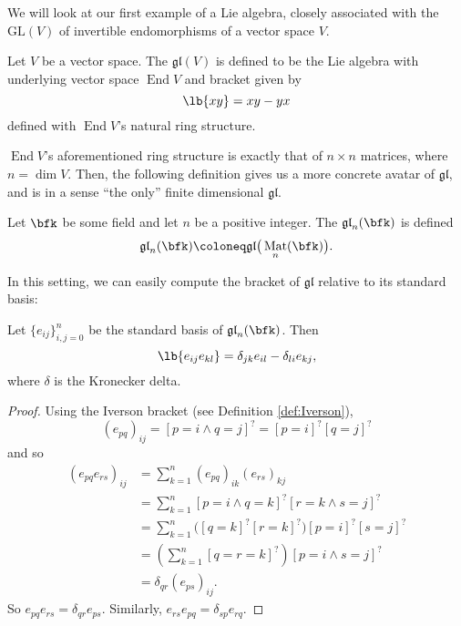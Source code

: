 \documentclass{article}
\DeclarePairedDelimiter\lb\lbrack\rbrack
\newcommand{\iverson}[1]{\ensuremath{\left[{#1}\right]^?}}
\DeclareMathOperator{\End}{End}
\DeclareMathOperator{\Mat}{Mat}
\newcommand*\GL{\ensuremath{\text{GL}}}
\newcommand*\glalg{\ensuremath{\mathfrak{gl}}}
\begin{document}
We will look at our first example of a Lie algebra, closely associated with the  $\GL(V)$ of invertible endomorphisms of a vector space $V$.

\begin{definition}[$\glalg$, abstractly]
    Let $V$ be a vector space.
    The  $\glalg(V)$ is defined to be the Lie algebra with underlying vector space $\End V$ and bracket given by
    \[
        \lb{xy}
        =
        xy - yx
    \]
    defined with $\End V$'s natural ring structure.
\end{definition}

    $\End V$'s aforementioned ring structure is exactly that of $n \times n$ matrices, where $n = \dim V$.
    Then, the following definition gives us a more concrete avatar of $\glalg$, and is in a sense ``the only'' finite dimensional $\glalg$.

\begin{definition}[$\glalg$, concretely]
    Let $\bfk$ be some field and let $n$ be a positive integer.
    The  $\glalg_n(\bfk)$ is defined
    \[
        \glalg_n(\bfk)
        \coloneq
        \glalg\big(\Mat_n(\bfk)\big).
    \]
\end{definition}

In this setting, we can easily compute the bracket of $\glalg$ relative to its standard basis:

\begin{proposition}
    Let $\{e_{ij}\}_{i,j=0}^n$ be the standard basis of $\glalg_n(\bfk)$.
    Then
    \[
        \lb{e_{ij}e_{kl}}
        =
        \delta_{jk}e_{il}
        -
        \delta_{li}e_{kj},
    \]
    where $\delta$ is the Kronecker delta.
\end{proposition}

\begin{proof}
    Using the Iverson bracket (see Definition \ref{def:Iverson}),
    \[
        (e_{pq})_{ij}
        =
        \iverson{p=i \wedge q=j}
        =
        \iverson{p=i}\iverson{q=j}
    \]
    and so
    \begin{align*}
        (e_{pq}e_{rs})_{ij}
        &=
        \sum_{k=1}^n
        (e_{pq})_{ik}
        (e_{rs})_{kj}
        \\
        &=
        \sum_{k=1}^n
        \iverson{p=i \wedge q=k}
        \iverson{r=k \wedge s=j}
        \\
        &=
        \sum_{k=1}^n
        \Big(
            \iverson{q=k}\iverson{r=k}
        \Big)
        \iverson{p=i}
        \iverson{s=j}
        \\
        &=
        \left(
            \sum_{k=1}^n
            \iverson{q=r=k}
        \right)
        \iverson{p=i \wedge s=j}
        \\
        &=
        \delta_{qr}
        (e_{ps})_{ij}.
    \end{align*}
    So $e_{pq}e_{rs} = \delta_{qr}e_{ps}$. 
    Similarly,
    $e_{rs}e_{pq} = \delta_{sp}e_{rq}$.
\end{proof}
\end{document}
